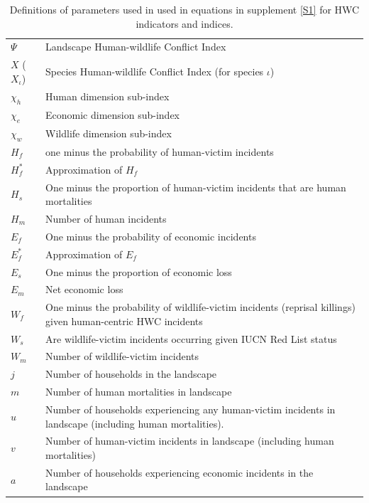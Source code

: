 \documentclass[fleqn,10pt]{olplainarticle}
\begin{document}
\begin{table}[!ht]
    \centering
    \caption{Definitions of parameters used in used in equations in supplement \ref{S1} for HWC indicators and indices.}
    \label{tab:index_params}
    \begin{tabular}{p{1cm} p{13cm}}
         $\Psi$ & Landscape Human-wildlife Conflict Index \\
         $X$ ($X_\iota$) &	Species Human-wildlife Conflict Index (for species $\iota$) \\
         $\chi_h$ &	Human dimension sub-index \\
         $\chi_e$ &	Economic dimension sub-index \\
         $\chi_w$ &	Wildlife dimension sub-index \\
         $H_f$ &	one minus the probability of human-victim incidents \\
         $H_f^\ast$ &  Approximation of $H_f$ \\
         $H_s$ &	One minus the proportion of human-victim incidents that are human mortalities \\
         $H_m$ &	Number of human incidents \\
         $E_f$ &	One minus the probability of economic incidents \\
         $E_f^\ast$ &  Approximation of $E_f$ \\
         $E_s$ &	One minus the proportion of economic loss \\
         $E_m$ &	Net economic loss \\
         $W_f$ &	One minus the probability of wildlife-victim incidents (reprisal killings) given human-centric HWC incidents \\
         $W_s$ &	Are wildlife-victim incidents occurring given IUCN Red List status  \\
         $W_m$ &	Number of wildlife-victim incidents \\
         $j$ & Number of households in the landscape \\
         $m$ &	Number of human mortalities in landscape \\
         $u$ &	Number of households experiencing any human-victim incidents in landscape (including human mortalities). \\
         $v$ &	Number of human-victim incidents in landscape (including human mortalities) \\
         $a$ &	Number of households experiencing economic incidents in the landscape \\

\end{tabular}
\end{table}
\end{document}
